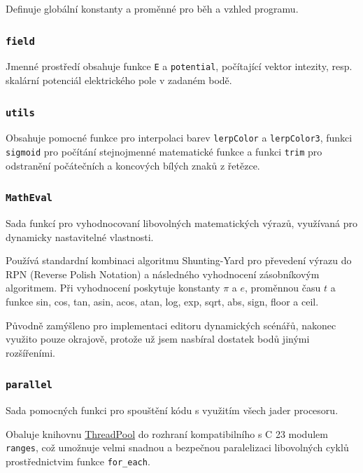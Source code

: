 \documentclass[12pt,a4paper]{article}
\newcommand{\code}[1]{\texttt{#1}}
\def\CC{{C\nolinebreak[4]\hspace{-.05em}\raisebox{.4ex}{\tiny\bf ++}}}
\begin{document}
Definuje globální konstanty a proměnné pro běh a vzhled programu.

\subsubsection{\code{field}}

Jmenné prostředí obsahuje funkce \code{E} a \code{potential}, počítající vektor
intezity, resp. skalární potenciál elektrického pole v zadaném bodě.

\subsubsection{\code{utils}}

Obsahuje pomocné funkce pro interpolaci barev \code{lerpColor} a \code{lerpColor3},
funkci \code{sigmoid} pro počítání stejnojmenné matematické funkce a funkci
\code{trim} pro odstranění počátečních a koncových bílých znaků z řetězce.

\subsubsection{\code{MathEval}}

Sada funkcí pro vyhodnocovaní libovolných matematických výrazů, využívaná pro
dynamicky nastavitelné vlastnosti.

Používá standardní kombinaci algoritmu Shunting-Yard pro převedení výrazu do RPN
(Reverse Polish Notation) a následného vyhodnocení zásobníkovým algoritmem. Při
vyhodnocení poskytuje konstanty $\pi$ a $e$, proměnnou času $t$ a funkce sin, cos,
tan, asin, acos, atan, log, exp, sqrt, abs, sign, floor a ceil.

Původně zamýšleno pro implementaci editoru dynamických scénářů, nakonec využito
pouze okrajově, protože už jsem nasbíral dostatek bodů jinými rozšířeními.

\subsubsection{\code{parallel}}

Sada pomocných funkci pro spouštění kódu s využitím všech jader procesoru.

Obaluje knihovnu \href{https://github.com/progschj/ThreadPool}{ThreadPool} do
rozhraní kompatibilního s \CC{} 23 modulem \code{ranges}, což umožnuje velmi
snadnou a bezpečnou paralelizaci libovolných cyklů prostřednictvim funkce
\code{for\_each}.
\end{document}
